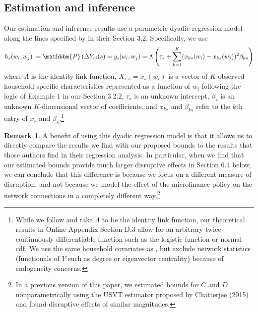 \documentclass[12pt]{article}
\theoremstyle{definition}
\newtheorem{remark}{Remark}
\begin{document}
\subsection{Estimation and inference}
Our estimation and inference results use a parametric dyadic regression model along the lines specified by \cite{banerjee2021changes} in their Section 3.2. Specifically, we use  
\begin{align}\label{parametric}
	h_{s}(w_i,w_j) := \mathbbm{P}\left(\Delta Y_{ij}(s) = y_s | w_{i}, w_{j}\right)  =  \Lambda\left(\tau_s + \sum_{k=1}^{K}(x_{ks}(w_{i}) - x_{ks}(w_{j}))^2\beta_{ks}\right)
\end{align}
where $\Lambda$ is the identity link function, $X_{i,s} = x_s(w_i)$ is a vector of $K$ observed household-specific characteristics represented as a function of $w_{i}$ following the logic of Example 1 in our Section 3.2.2, $\tau_s$ is an unknown intercept, $\beta_s$ is an unknown $K$-dimensional vector of coefficients, and $x_{ks}$ and $\beta_{ks}$ refer to the $k$th entry of $x_{s}$ and $\beta_{s}$.\footnote{While we follow \cite{banerjee2021changes} and take $\Lambda$ to be the identity link function, our theoretical results in Online Appendix Section D.3 allow for an arbitrary twice continuously differentiable function such as the logistic function or normal cdf. We use the same household covariates as  \cite{banerjee2021changes}, but exclude network statistics (functionals of $Y$ such as degree or eigenvector centrality) because of endogeneity concerns.} 

\begin{remark}
A benefit of using this dyadic regression model is that it allows us to directly compare the results we find with our proposed bounds to the results that those authors find in their regression analysis. In particular, when we find that our estimated bounds provide much larger disruptive effects in Section 6.4 below, we can conclude that this difference is because we focus on a different measure of disruption, and not because we model the effect of the microfinance policy on the network connections in a completely different way.\footnote{In a previous version of this paper, we estimated bounds for $C$ and $D$ nonparametrically using the USVT estimator proposed by Chatterjee (2015) and found disruptive effects of similar magnitudes.}  
\end{remark}

\end{document}
